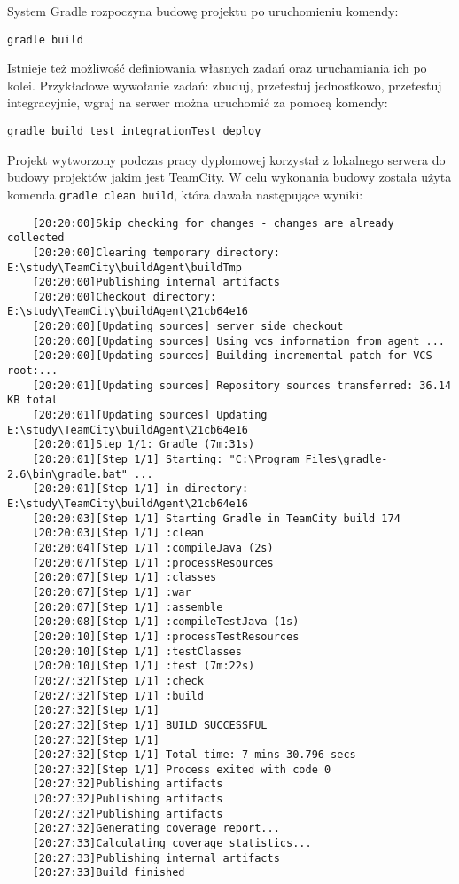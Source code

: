 System Gradle rozpoczyna budowę projektu po uruchomieniu komendy:

\verb|gradle build|

Istnieje też możliwość definiowania własnych zadań oraz uruchamiania ich po kolei. Przykładowe wywołanie zadań: zbuduj, przetestuj jednostkowo, przetestuj integracyjnie, wgraj na serwer można uruchomić za pomocą komendy:


\verb|gradle build test integrationTest deploy|

Projekt wytworzony podczas pracy dyplomowej korzystał z lokalnego serwera do budowy projektów jakim jest TeamCity. W celu wykonania budowy została użyta komenda \verb|gradle clean build|, która dawała następujące wyniki:

\begin{verbatim}
	[20:20:00]Skip checking for changes - changes are already collected
	[20:20:00]Clearing temporary directory: E:\study\TeamCity\buildAgent\buildTmp
	[20:20:00]Publishing internal artifacts
	[20:20:00]Checkout directory: E:\study\TeamCity\buildAgent\21cb64e16
	[20:20:00][Updating sources] server side checkout
	[20:20:00][Updating sources] Using vcs information from agent ...
	[20:20:00][Updating sources] Building incremental patch for VCS root:...
	[20:20:01][Updating sources] Repository sources transferred: 36.14 KB total
	[20:20:01][Updating sources] Updating E:\study\TeamCity\buildAgent\21cb64e16
	[20:20:01]Step 1/1: Gradle (7m:31s)
	[20:20:01][Step 1/1] Starting: "C:\Program Files\gradle-2.6\bin\gradle.bat" ...
	[20:20:01][Step 1/1] in directory: E:\study\TeamCity\buildAgent\21cb64e16
	[20:20:03][Step 1/1] Starting Gradle in TeamCity build 174
	[20:20:03][Step 1/1] :clean
	[20:20:04][Step 1/1] :compileJava (2s)
	[20:20:07][Step 1/1] :processResources
	[20:20:07][Step 1/1] :classes
	[20:20:07][Step 1/1] :war
	[20:20:07][Step 1/1] :assemble
	[20:20:08][Step 1/1] :compileTestJava (1s)
	[20:20:10][Step 1/1] :processTestResources
	[20:20:10][Step 1/1] :testClasses
	[20:20:10][Step 1/1] :test (7m:22s)
	[20:27:32][Step 1/1] :check
	[20:27:32][Step 1/1] :build
	[20:27:32][Step 1/1] 
	[20:27:32][Step 1/1] BUILD SUCCESSFUL
	[20:27:32][Step 1/1] 
	[20:27:32][Step 1/1] Total time: 7 mins 30.796 secs
	[20:27:32][Step 1/1] Process exited with code 0
	[20:27:32]Publishing artifacts
	[20:27:32]Publishing artifacts
	[20:27:32]Publishing artifacts
	[20:27:32]Generating coverage report...
	[20:27:33]Calculating coverage statistics...
	[20:27:33]Publishing internal artifacts
	[20:27:33]Build finished
\end{verbatim}

